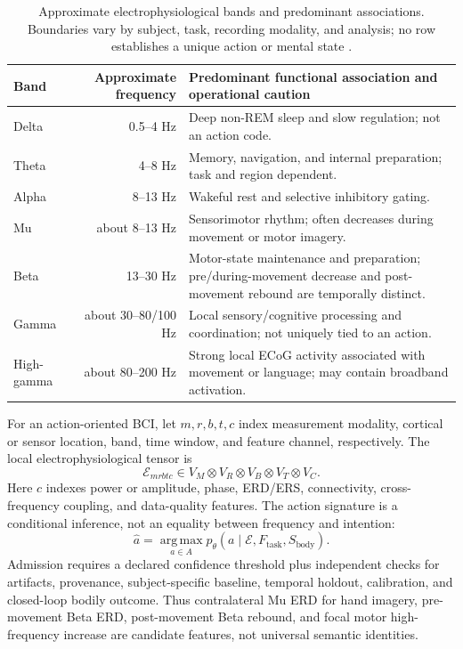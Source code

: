\documentclass[10pt,twocolumn]{article}
\theoremstyle{definition}
\theoremstyle{plain}
\theoremstyle{remark}
\begin{document}
\begin{table}[!t]
\centering
\small
\caption{Approximate electrophysiological bands and predominant associations.  Boundaries vary by subject, task, recording modality, and analysis; no row establishes a unique action or mental state \citep{buzsaki2004oscillations,pfurtscheller1999erd}.}
\label{tab:eeg-bands}
\begin{tabularx}{\textwidth}{@{}l r X@{}}
\toprule
Band & Approximate frequency & Predominant functional association and operational caution \\
\midrule
Delta & 0.5--4 Hz & Deep non-REM sleep and slow regulation; not an action code. \\
Theta & 4--8 Hz & Memory, navigation, and internal preparation; task and region dependent. \\
Alpha & 8--13 Hz & Wakeful rest and selective inhibitory gating. \\
Mu & about 8--13 Hz & Sensorimotor rhythm; often decreases during movement or motor imagery. \\
Beta & 13--30 Hz & Motor-state maintenance and preparation; pre/during-movement decrease and post-movement rebound are temporally distinct. \\
Gamma & about 30--80/100 Hz & Local sensory/cognitive processing and coordination; not uniquely tied to an action. \\
High-gamma & about 80--200 Hz & Strong local ECoG activity associated with movement or language; may contain broadband activation. \\
\bottomrule
\end{tabularx}
\end{table}

For an action-oriented BCI, let $m,r,b,t,c$ index measurement modality, cortical or sensor location, band, time window, and feature channel, respectively.  The local electrophysiological tensor is
\begin{equation}
\mathcal E_{mrbtc}\in V_M\otimes V_R\otimes V_B\otimes V_T\otimes V_C.
\label{eq:bci-tensor}
\end{equation}
Here $c$ indexes power or amplitude, phase, ERD/ERS, connectivity, cross-frequency coupling, and data-quality features.
The action signature is a conditional inference, not an equality between frequency and intention:
\begin{equation}
\widehat a=\operatorname*{arg\,max}_{a\in A}
 p_\theta\!\left(a\mid \mathcal E,F_{\mathrm{task}},S_{\mathrm{body}}\right).
\label{eq:bci-decoder}
\end{equation}
Admission requires a declared confidence threshold plus independent checks for artifacts, provenance, subject-specific baseline, temporal holdout, calibration, and closed-loop bodily outcome.  Thus contralateral Mu ERD for hand imagery, pre-movement Beta ERD, post-movement Beta rebound, and focal motor high-frequency increase are candidate features, not universal semantic identities.
\end{document}

